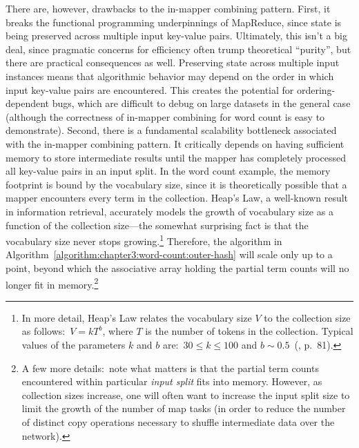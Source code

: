 \documentclass[11pt]{article}
\begin{document}
There are, however, drawbacks to the in-mapper combining pattern.
First, it breaks the functional programming underpinnings of
MapReduce, since state is being preserved across multiple input
key-value pairs.  Ultimately, this isn't a big deal, since pragmatic
concerns for efficiency often trump theoretical ``purity'', but there
are practical consequences as well.  Preserving state across multiple
input instances means that algorithmic behavior may depend on the
order in which input key-value pairs are encountered.  This creates
the potential for ordering-dependent bugs, which are difficult to
debug on large datasets in the general case (although the correctness
of in-mapper combining for word count is easy to demonstrate).
Second, there is a fundamental scalability bottleneck associated with
the in-mapper combining pattern.  It critically depends on having
sufficient memory to store intermediate results until the mapper has
completely processed all key-value pairs in an input split.  In the
word count example, the memory footprint is bound by the vocabulary
size, since it is theoretically possible that a mapper encounters
every term in the collection.  Heap's Law, a well-known result in
information retrieval, accurately models the growth of vocabulary size
as a function of the collection size---the somewhat surprising fact is
that the vocabulary size never stops growing.\footnote{In more detail,
  Heap's Law relates the vocabulary size $V$ to the collection size as
  follows:\ $V =kT^b$, where $T$ is the number of tokens in the
  collection.  Typical values of the parameters $k$ and $b$ are:\ $30
  \leq k \leq 100$ and $b \sim 0.5$~(\cite{Manning_etal_2008},
  p.\ 81).}  Therefore, the algorithm in
Algorithm~\ref{algorithm:chapter3:word-count:outer-hash} will scale only up
to a point, beyond which the associative array holding the partial
term counts will no longer fit in memory.\footnote{A few more
  details:\ note what matters is that the partial term counts
  encountered within particular \emph{input split} fits into memory.
  However, as collection sizes increase, one will often want to
  increase the input split size to limit the growth of the number of
  map tasks (in order to reduce the number of distinct copy operations
  necessary to shuffle intermediate data over the network).}
\end{document}
